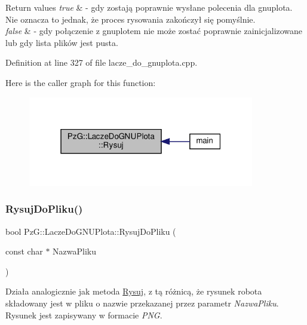\begin{DoxyRetVals}{Return values}
{\em true} & -\/ gdy zostają poprawnie wysłane polecenia dla gnuplota. Nie oznacza to jednak, że proces rysowania zakończył się pomyślnie. \\
\hline
{\em false} & -\/ gdy połączenie z gnuplotem nie może zostać poprawnie zainicjalizowane lub gdy lista plików jest pusta. \\
\hline
\end{DoxyRetVals}


Definition at line 327 of file lacze\+\_\+do\+\_\+gnuplota.\+cpp.

Here is the caller graph for this function\+:\nopagebreak
\begin{figure}[H]
\begin{center}
\leavevmode
\includegraphics[width=280pt]{class_pz_g_1_1_lacze_do_g_n_u_plota_a065f5b8402737cc62b0ad4f66d028335_icgraph}
\end{center}
\end{figure}
\mbox{\label{class_pz_g_1_1_lacze_do_g_n_u_plota_addae9ac156ae2fb227f792faff3aa148}} 
\subsubsection{\texorpdfstring{Rysuj\+Do\+Pliku()}{RysujDoPliku()}}
{\footnotesize\ttfamily bool Pz\+G\+::\+Lacze\+Do\+G\+N\+U\+Plota\+::\+Rysuj\+Do\+Pliku (\begin{DoxyParamCaption}\item[{const char $\ast$}]{Nazwa\+Pliku }\end{DoxyParamCaption})}

Działa analogicznie jak metoda \hyperlink{class_pz_g_1_1_lacze_do_g_n_u_plota_a065f5b8402737cc62b0ad4f66d028335}{Rysuj}, z tą różnicą, że rysunek robota składowany jest w pliku o nazwie przekazanej przez parametr {\itshape Nazwa\+Pliku}. Rysunek jest zapisywany w formacie {\itshape P\+NG}.

